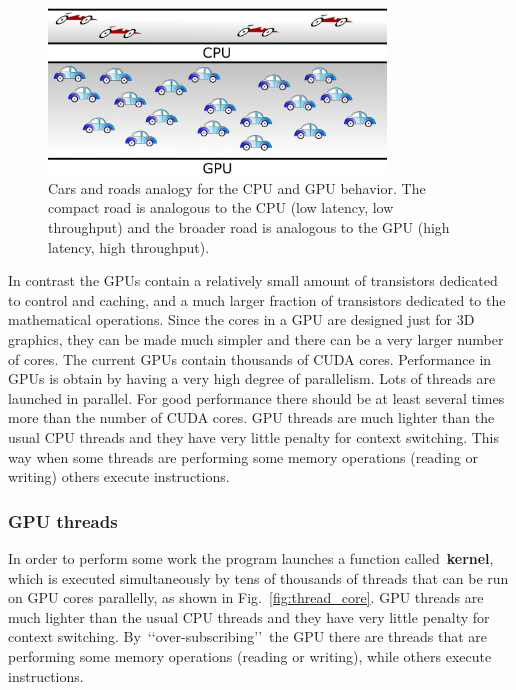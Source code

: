 \begin{figure}[!h]
\centering\includegraphics[width=0.8\textwidth]{fig_hardware/cpu_gpu_highway.jpg}
\caption{Cars and roads analogy for the CPU and GPU behavior. The compact road is analogous to the CPU (low latency, low throughput) and the broader road is analogous to the GPU (high latency, high throughput).}\label{fig:cpu_gpu_highway}
\end{figure}


\par
In contrast the GPUs contain a relatively small amount of transistors dedicated to control and caching, and a much larger fraction of transistors dedicated to the mathematical operations.
Since the cores in a GPU are designed just for 3D graphics, they can be made much simpler and there can be a very larger number of cores.
The current GPUs contain thousands of CUDA cores.
Performance in GPUs is obtain by having a very high degree of parallelism.
Lots of threads are launched in parallel.
For good performance there should be at least several times more than the number of CUDA cores.
GPU threads are much lighter than the usual CPU threads and they have very little penalty for context switching.
This way when some threads are performing some memory operations (reading or writing) others execute instructions.


\subsubsection{GPU threads}


\par
In order to perform some work the program launches a function called~\textbf{kernel}, which is executed simultaneously by tens of thousands of threads that can be run on GPU cores parallelly, as shown in Fig.~\ref{fig:thread_core}.
GPU threads are much lighter than the usual CPU threads and they have very little penalty for context switching.
By~\lq\lq over-subscribing\rq\rq~the GPU there are threads that are performing some memory operations (reading or writing), while others execute instructions.


